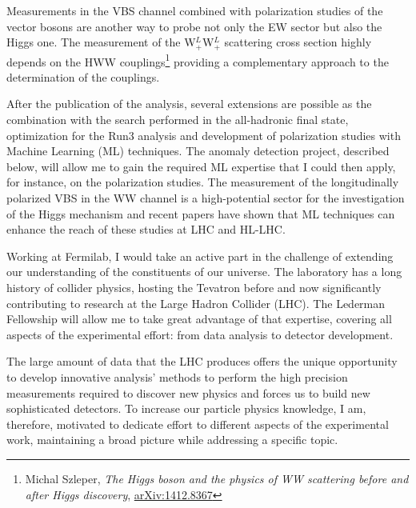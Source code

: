 {\begin{flushleft}
Measurements in the VBS channel combined with polarization studies of the vector bosons are another way to probe not only the EW sector but also the Higgs one.
The measurement of the  W$^L_+$W$^L_+$ scattering cross section highly depends on the HWW couplings\footnote{Michal Szleper, {\em The Higgs boson and the physics of WW scattering before and after Higgs discovery}, \href{https://arxiv.org/pdf/1412.8367}{arXiv:1412.8367}} providing a complementary approach to the determination of the couplings.


 

After the publication of the analysis, several extensions are possible as the combination with the search performed in the all-hadronic final state, optimization for the Run3 analysis and development of polarization studies with Machine Learning (ML) techniques. The anomaly detection project, described below, will allow me to gain the required ML expertise that I could then apply, for instance, on the polarization studies. The measurement of the longitudinally polarized VBS in the WW channel is a high-potential sector for the investigation of the Higgs mechanism and recent papers have shown that ML techniques can enhance the reach of these studies at LHC and HL-LHC. 

\vspace{\baselineskip}

Working at Fermilab, I would take an active part in the challenge of extending our understanding of the constituents of our universe. The laboratory has a long history of collider physics, hosting the Tevatron before and now significantly contributing to research at the Large Hadron Collider (LHC). The Lederman Fellowship will allow me to take great advantage of that expertise, covering all aspects of the experimental effort: from data analysis to detector development.

\vspace{\baselineskip}
The large amount of data that the LHC produces offers the unique opportunity to develop innovative analysis' methods to perform the high precision measurements required to discover new physics and forces us to build new sophisticated detectors.
To increase our particle physics knowledge, I am, therefore, motivated to dedicate effort to different aspects of the experimental work, maintaining a broad picture while addressing a specific topic.


\end{flushleft}}
